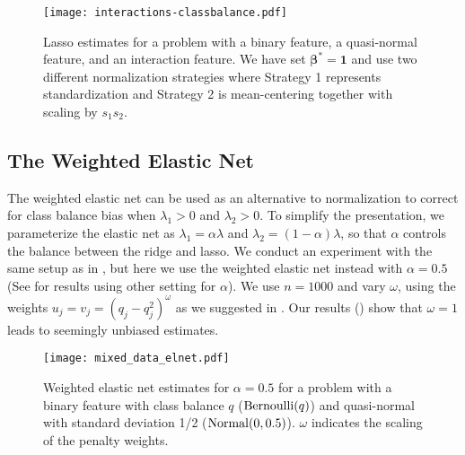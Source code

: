 \begin{figure}[htpb]
  \centering
  \texttt{[image: interactions-classbalance.pdf]}
  \caption{%
    Lasso estimates for a problem with a binary feature, a quasi-normal feature, and
    an interaction feature. We have set \(\bm{\beta}^* = \bm{1}\) and use two different normalization strategies where
    Strategy 1 represents standardization and Strategy 2 is mean-centering
    together with scaling by \(s_1 s_2\).
  }
  \label{fig:interactions}
\end{figure}

\subsection{The Weighted Elastic Net}

The weighted elastic net can be used as an alternative to normalization to correct for
class balance bias when \(\lambda_1 > 0\) and \(\lambda_2 >0\). To simplify the
presentation, we parameterize the elastic net as \(\lambda_1 = \alpha \lambda \) and
\(\lambda_2 = (1-\alpha) \lambda\), so that \(\alpha\) controls the balance between the
ridge and lasso. We conduct an experiment with the same setup as in
, but here we use the weighted elastic net instead with
\(\alpha = 0.5\) (See  for results using
other setting for \(\alpha\)). We use \(n=1000\) and vary \(\omega\), using the weights
\(u_j = v_j = (q_j - q_j^2)^{\omega}\) as we suggested in . Our
results () show that \(\omega = 1\) leads to seemingly unbiased
estimates.

\begin{figure}[htpb]
  \centering
  \texttt{[image: mixed\_data\_elnet.pdf]}
  \caption{%
    Weighted elastic net estimates for \(\alpha = 0.5\) for a problem with a binary
    feature with class balance \(q\) (\(\operatorname{Bernoulli}(q)\)) and quasi-normal
    with standard deviation 1/2 (\(\operatorname{Normal}(0, 0.5)\)). \(\omega\) indicates
    the scaling of the penalty weights.
  }
  \label{fig:mixed-data-elnet}
\end{figure}

